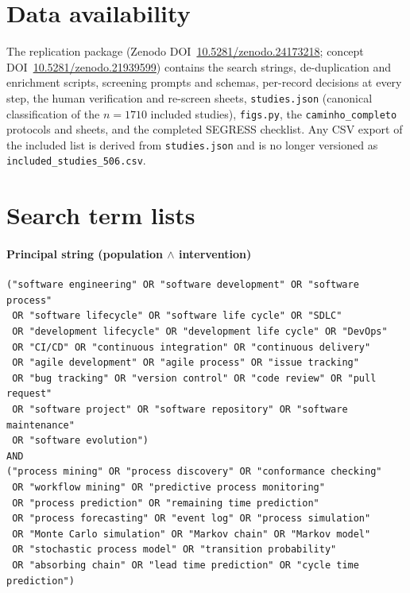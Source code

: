 \documentclass[preprint,12pt,authoryear=false]{elsarticle}
\begin{document}
\section*{Data availability}
The replication package (Zenodo DOI~\href{https://doi.org/10.5281/zenodo.24173218}{10.5281/zenodo.24173218}; concept DOI~\href{https://doi.org/10.5281/zenodo.21939599}{10.5281/zenodo.21939599}) contains the search strings, de-duplication and enrichment scripts, screening prompts and schemas, per-record decisions at every step, the human verification and re-screen sheets, \texttt{studies.json} (canonical classification of the $n = 1710$ included studies), \texttt{figs.py}, the \texttt{caminho\_completo} protocols and sheets, and the completed SEGRESS checklist. Any CSV export of the included list is derived from \texttt{studies.json} and is no longer versioned as \texttt{included\_studies\_506.csv}.

\appendix

\section{Search term lists}\label{app:strings}

\paragraph{Principal string (population $\wedge$ intervention)}
\begin{footnotesize}\begin{verbatim}
("software engineering" OR "software development" OR "software process"
 OR "software lifecycle" OR "software life cycle" OR "SDLC"
 OR "development lifecycle" OR "development life cycle" OR "DevOps"
 OR "CI/CD" OR "continuous integration" OR "continuous delivery"
 OR "agile development" OR "agile process" OR "issue tracking"
 OR "bug tracking" OR "version control" OR "code review" OR "pull request"
 OR "software project" OR "software repository" OR "software maintenance"
 OR "software evolution")
AND
("process mining" OR "process discovery" OR "conformance checking"
 OR "workflow mining" OR "predictive process monitoring"
 OR "process prediction" OR "remaining time prediction"
 OR "process forecasting" OR "event log" OR "process simulation"
 OR "Monte Carlo simulation" OR "Markov chain" OR "Markov model"
 OR "stochastic process model" OR "transition probability"
 OR "absorbing chain" OR "lead time prediction" OR "cycle time prediction")
\end{verbatim}\end{footnotesize}
\end{document}
